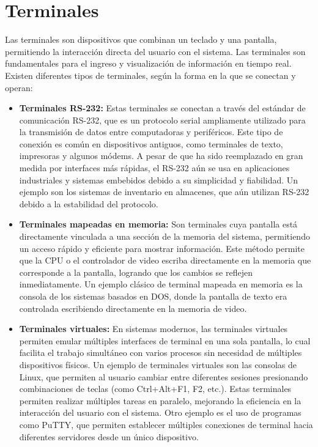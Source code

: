 \newpage

\section{Terminales}
Las terminales son dispositivos que combinan un teclado y una pantalla, permitiendo la interacción directa del usuario con el sistema. Las terminales son fundamentales para el ingreso y visualización de información en tiempo real. Existen diferentes tipos de terminales, según la forma en la que se conectan y operan:
\begin{tcolorbox}[title= Categorias de terminales]
	\begin{itemize}
		
		
		\item \textbf{Terminales RS-232:}
		Estas terminales se conectan a través del estándar de comunicación RS-232, que es un protocolo serial ampliamente utilizado para la transmisión de datos entre computadoras y periféricos. Este tipo de conexión es común en dispositivos antiguos, como terminales de texto, impresoras y algunos módems. A pesar de que ha sido reemplazado en gran medida por interfaces más rápidas, el RS-232 aún se usa en aplicaciones industriales y sistemas embebidos debido a su simplicidad y fiabilidad. Un ejemplo son los sistemas de inventario en almacenes, que aún utilizan RS-232 debido a la estabilidad del protocolo.
		\item \textbf{Terminales mapeadas en memoria:}
		Son terminales cuya pantalla está directamente vinculada a una sección de la memoria del sistema, permitiendo un acceso rápido y eficiente para mostrar información. Este método permite que la CPU o el controlador de video escriba directamente en la memoria que corresponde a la pantalla, logrando que los cambios se reflejen inmediatamente. Un ejemplo clásico de terminal mapeada en memoria es la consola de los sistemas basados en DOS, donde la pantalla de texto era controlada escribiendo directamente en la memoria de video.
		\item \textbf{Terminales virtuales:}
		En sistemas modernos, las terminales virtuales permiten emular múltiples interfaces de terminal en una sola pantalla, lo cual facilita el trabajo simultáneo con varios procesos sin necesidad de múltiples dispositivos físicos. Un ejemplo de terminales virtuales son las consolas de Linux, que permiten al usuario cambiar entre diferentes sesiones presionando combinaciones de teclas (como Ctrl+Alt+F1, F2, etc.). Estas terminales permiten realizar múltiples tareas en paralelo, mejorando la eficiencia en la interacción del usuario con el sistema. Otro ejemplo es el uso de programas como PuTTY, que permiten establecer múltiples conexiones de terminal hacia diferentes servidores desde un único dispositivo.
		
	\end{itemize}
\end{tcolorbox}

